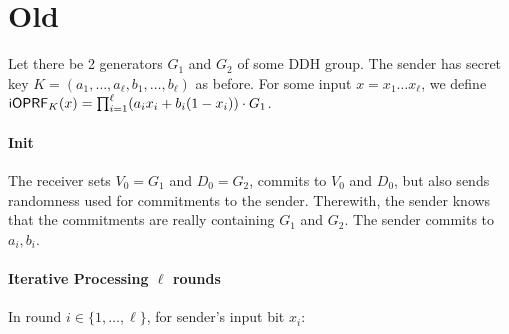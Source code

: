 \documentclass{article}
\begin{document}
\newpage
\section{Old}
Let there be 2 generators $G_1$ and $G_2$ of some DDH group. The
sender has secret key $K=(a_1,\ldots,a_\ell,b_1,\ldots,b_\ell)$ as
before. For some input $x=x_1\ldots{}x_\ell$, we define
$\mathsf{i}\mathsf{OPRF}_K(x)=\prod_{i=1}^{\ell}(a_ix_i+b_i(1-x_i))\cdot{}G_1$.

\paragraph{Init}
The receiver sets $V_0 = G_1$ and $D_0 = G_2$, commits to $V_0$ and
$D_0$, but also sends randomness used for commitments to the
sender. Therewith, the sender knows that the commitments are really
containing $G_1$ and $G_2$. The sender commits to $a_i,b_i$.

\paragraph{Iterative Processing $\ell$ rounds}
In round $i\in\{1,\ldots,\ell\}$, for sender's input bit $x_i$:
\end{document}

